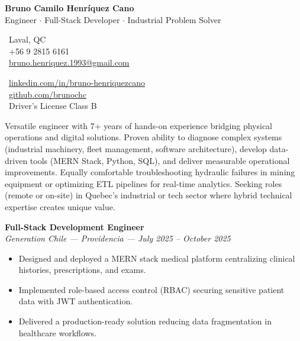 \documentclass[10pt,letterpaper]{article}
\begin{document}
\begin{center}
    {\Huge \textbf{Bruno Camilo Henríquez Cano}} \\[0.2cm]
    {\Large Engineer $\cdot$ Full-Stack Developer $\cdot$ Industrial Problem Solver}
\end{center}

\vspace{0.3cm}

\noindent
\begin{minipage}[t]{0.5\textwidth}
    \faMapMarker\ Laval, QC \\
    \faPhone\ +56 9 2815 6161 \\
    \faEnvelope\ \href{mailto:bruno.henriquez.1993@gmail.com}{bruno.henriquez.1993@gmail.com}
\end{minipage}
\begin{minipage}[t]{0.5\textwidth}
    \faLinkedin\ \href{https://linkedin.com/in/bruno-henriquezcano}{linkedin.com/in/bruno-henriquezcano} \\
    \faGithub\ \href{https://github.com/brunochc}{github.com/brunochc} \\
    \faCar\ Driver's License Class B
\end{minipage}

\vspace{0.4cm}


\vspace{0.2cm}

\noindent Versatile engineer with 7+ years of hands-on experience bridging physical operations and digital solutions. Proven ability to diagnose complex systems (industrial machinery, fleet management, software architecture), develop data-driven tools (MERN Stack, Python, SQL), and deliver measurable operational improvements. Equally comfortable troubleshooting hydraulic failures in mining equipment or optimizing ETL pipelines for real-time analytics. Seeking roles (remote or on-site) in Quebec's industrial or tech sector where hybrid technical expertise creates unique value.

\vspace{0.4cm}


\vspace{0.3cm}

\noindent \textbf{Full-Stack Development Engineer} \\
\textit{Generation Chile — Providencia — July 2025 – October 2025}
\begin{itemize}
    \item Designed and deployed a MERN stack medical platform centralizing clinical histories, prescriptions, and exams.
    \item Implemented role-based access control (RBAC) securing sensitive patient data with JWT authentication.
    \item Delivered a production-ready solution reducing data fragmentation in healthcare workflows.
\end{itemize}
\end{document}
